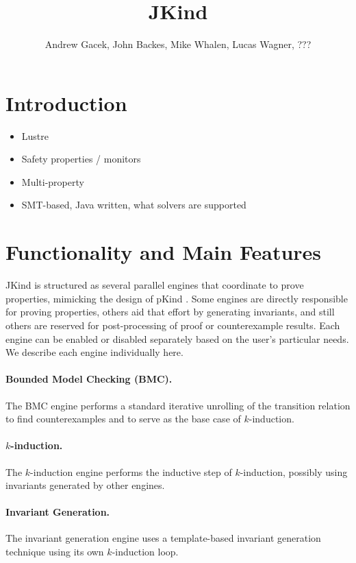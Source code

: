 \documentclass{llncs}
\title{JKind}
\author{Andrew Gacek, John Backes, Mike Whalen, Lucas Wagner, ???}
\begin{document}
\maketitle

\section{Introduction}

\begin{itemize}
\item Lustre
\item Safety properties / monitors
\item Multi-property
\item SMT-based, Java written, what solvers are supported
\end{itemize}

\section{Functionality and Main Features}

JKind is structured as several parallel engines that coordinate to
prove properties, mimicking the design of pKind \cite{}. Some engines
are directly responsible for proving properties, others aid that
effort by generating invariants, and still others are reserved for
post-processing of proof or counterexample results. Each engine can be
enabled or disabled separately based on the user's particular needs.
We describe each engine individually here.

\paragraph{Bounded Model Checking (BMC).} The BMC engine performs a
standard iterative unrolling of the transition relation to find
counterexamples and to serve as the base case of $k$-induction.

\paragraph{$k$-induction.} The $k$-induction engine performs the
inductive step of $k$-induction, possibly using invariants generated by
other engines.

\paragraph{Invariant Generation.} The invariant generation engine
uses a template-based invariant generation technique \cite{} using its
own $k$-induction loop.
\end{document}
